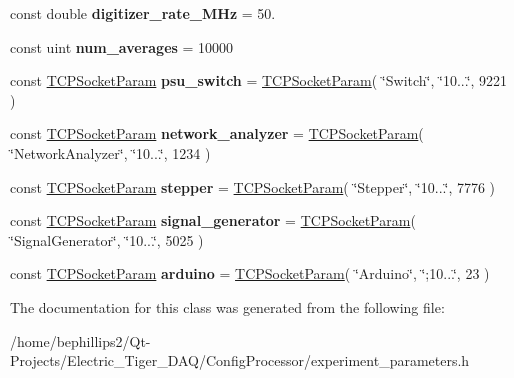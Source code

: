 \begin{DoxyCompactItemize}
\item 
const double {\bfseries digitizer\+\_\+rate\+\_\+\+M\+Hz} = 50.\hypertarget{class_experiment_parameters_acfd9ce58ec8a3407d76c10db7a33168e}{}\label{class_experiment_parameters_acfd9ce58ec8a3407d76c10db7a33168e}

\item 
const uint {\bfseries num\+\_\+averages} = 10000\hypertarget{class_experiment_parameters_a7434e2b3a7f7eccdc212cc55651922e2}{}\label{class_experiment_parameters_a7434e2b3a7f7eccdc212cc55651922e2}

\item 
const \hyperlink{struct_t_c_p_socket_param}{T\+C\+P\+Socket\+Param} {\bfseries psu\+\_\+switch} = \hyperlink{struct_t_c_p_socket_param}{T\+C\+P\+Socket\+Param}( \char`\"{}Switch\char`\"{}, \char`\"{}10...\char`\"{}, 9221 )\hypertarget{class_experiment_parameters_ae700482ce71b3a5558ee41093913297a}{}\label{class_experiment_parameters_ae700482ce71b3a5558ee41093913297a}

\item 
const \hyperlink{struct_t_c_p_socket_param}{T\+C\+P\+Socket\+Param} {\bfseries network\+\_\+analyzer} = \hyperlink{struct_t_c_p_socket_param}{T\+C\+P\+Socket\+Param}( \char`\"{}Network\+Analyzer\char`\"{}, \char`\"{}10...\char`\"{}, 1234 )\hypertarget{class_experiment_parameters_afa22bbf371056c9f48ab16fc75ae8bc7}{}\label{class_experiment_parameters_afa22bbf371056c9f48ab16fc75ae8bc7}

\item 
const \hyperlink{struct_t_c_p_socket_param}{T\+C\+P\+Socket\+Param} {\bfseries stepper} = \hyperlink{struct_t_c_p_socket_param}{T\+C\+P\+Socket\+Param}( \char`\"{}Stepper\char`\"{}, \char`\"{}10...\char`\"{}, 7776 )\hypertarget{class_experiment_parameters_ae51cbbd261707bafe2cfd50cef214cb5}{}\label{class_experiment_parameters_ae51cbbd261707bafe2cfd50cef214cb5}

\item 
const \hyperlink{struct_t_c_p_socket_param}{T\+C\+P\+Socket\+Param} {\bfseries signal\+\_\+generator} = \hyperlink{struct_t_c_p_socket_param}{T\+C\+P\+Socket\+Param}( \char`\"{}Signal\+Generator\char`\"{}, \char`\"{}10...\char`\"{}, 5025 )\hypertarget{class_experiment_parameters_a3433956c9a6d19db55ce7ea22c3ec731}{}\label{class_experiment_parameters_a3433956c9a6d19db55ce7ea22c3ec731}

\item 
const \hyperlink{struct_t_c_p_socket_param}{T\+C\+P\+Socket\+Param} {\bfseries arduino} = \hyperlink{struct_t_c_p_socket_param}{T\+C\+P\+Socket\+Param}( \char`\"{}Arduino\char`\"{}, \char`\"{};10...\char`\"{}, 23 )\hypertarget{class_experiment_parameters_a3657583fc47ddc41cacc1954297fe8ba}{}\label{class_experiment_parameters_a3657583fc47ddc41cacc1954297fe8ba}

\end{DoxyCompactItemize}


The documentation for this class was generated from the following file\+:\begin{DoxyCompactItemize}
\item 
/home/bephillips2/\+Qt-\/\+Projects/\+Electric\+\_\+\+Tiger\+\_\+\+D\+A\+Q/\+Config\+Processor/experiment\+\_\+parameters.\+h\end{DoxyCompactItemize}
